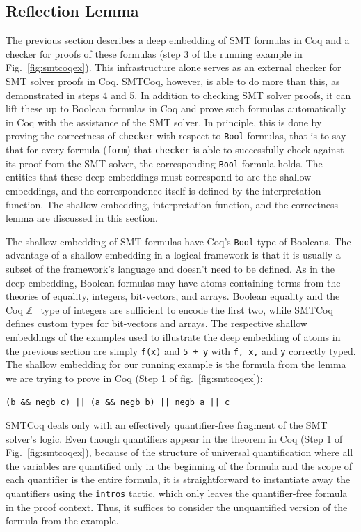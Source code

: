 \documentclass{article}
\begin{document}
	\subsection{Reflection Lemma}
	\label{sec:refl}
	The previous section describes a 
	deep embedding of SMT formulas 
	in Coq and a checker for 
	proofs of these formulas (step 3 of 
	the running example in 
	Fig.~\ref{fig:smtcoqex}). 
	This infrastructure alone serves 
	as an external checker for 
	SMT solver proofs in Coq.
	SMTCoq, however, is able to 
	do more than this, as demonstrated
	in steps 4 and 5. In addition 
	to checking SMT solver proofs, 
	it can lift these up to 
	Boolean formulas in Coq and
	prove such formulas automatically
	in Coq with the assistance of 
	the SMT solver. In principle,
	this is done by proving the
	correctness of \texttt{checker}
	with respect to \texttt{Bool}
	formulas, that is to say that 
	for every formula (\texttt{form})
	that \texttt{checker} is able to 
	successfully check against its
	proof from the SMT solver, the 
	corresponding \texttt{Bool}
	formula holds. The entities
	that these deep embeddings 
	must correspond to are the shallow
	embeddings, and the correspondence 
	itself is defined by the 
	interpretation function. The 
	shallow embedding, interpretation
	function, and the correctness 
	lemma are discussed in this 
	section.
	
	The shallow embedding of SMT formulas
	have Coq's \texttt{Bool} type of 
	Booleans. The advantage of a 
	shallow embedding in a logical 
	framework is that it is usually 
	a subset of the framework's language
	and doesn't need to be defined. 
	As in the deep embedding, Boolean
	formulas may have atoms containing 
	terms from the theories of 
	equality, integers, bit-vectors,
	and arrays. Boolean equality and
	the Coq $\mathbb{Z}$~\cite{CoqZ} type 
	of integers are sufficient to encode
	the first two, while SMTCoq 
	defines custom types for 
	bit-vectors and arrays. The
	respective shallow embeddings of
	the examples used to illustrate 
	the deep embedding of atoms in the 
	previous section are simply 
	\texttt{f(x)} and \texttt{5 + y} 
	with \texttt{f, x,} and \texttt{y}
	correctly typed. The shallow 
	embedding for our running example 
	is the formula from the lemma we 
	are trying to prove in Coq
	(Step 1 of fig.~\ref{fig:smtcoqex}):
	\begin{center}
		\texttt{(b \&\& negb c) || (a 
			\&\& negb b) || negb a || c}
	\end{center}	 
	SMTCoq deals only with an effectively 
	quantifier-free fragment of the SMT 
	solver's logic. Even though quantifiers 
	appear in the theorem in Coq (Step 1 of 
	Fig.~\ref{fig:smtcoqex}), because
	of the structure of universal 
	quantification where all the variables
	are quantified only in the beginning 
	of the formula and the scope of 
	each quantifier is the entire formula, 
	it is straightforward
	to instantiate away the quantifiers
	using the \texttt{intros} tactic, which 
	only leaves the quantifier-free 
	formula in the proof context. 
	Thus, it suffices to consider the 
	unquantified version of the 
	formula from the example.
	
\end{document}

